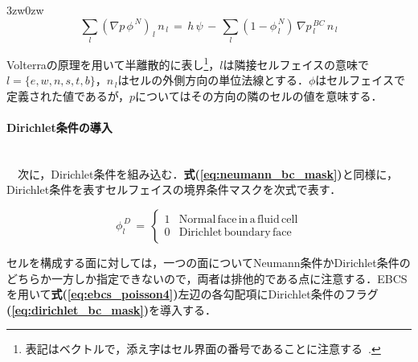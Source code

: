 \begin{indentation}{3zw}{0zw}
\begin{equation}
\sum \limits_l {\left( \nabla p \,\phi^{\,N} \right)}_{\,l} \,n_{\,l}
\,=\, h\,\psi \,-\, \sum \limits_l \left( 1-\phi^{\,N}_{\,l} \right) \,\nabla p^{\,BC}_{\,l} \,n_{\,l}
\label{eq:ebcs_poisson4}
\end{equation}

\noindent Volterraの原理を用いて半離散的に表し\footnote{表記はベクトルで，添え字はセル界面の番号であることに注意する~\cite[p.~39]{nakamura:98:handbook}.}，$l$は隣接セルフェイスの意味で$l=\{e,w,n,s,t,b\}$，$n_{\,l}$はセルの外側方向の単位法線とする．$\phi$はセルフェイスで定義された値であるが，$p$についてはその方向の隣のセルの値を意味する．

%
\paragraph{Dirichlet条件の導入} $\mbox{}$\\
　次に，Dirichlet条件を組み込む．\textbf{式(\ref{eq:neumann_bc_mask})}と同様に，Dirichlet条件を表すセルフェイスの境界条件マスクを次式で表す．

\begin{equation}
\phi^{\,D}_l \, = \, \left\{
\begin{array}{ll}
1 & \mathrm{Normal\,face\,in\,a\,fluid\,cell}\\
0 & \mathrm{Dirichlet\,boundary\,face}
\end{array} \right. 
\label{eq:dirichlet_bc_mask}
\end{equation}

\noindent セルを構成する面に対しては，一つの面についてNeumann条件かDirichlet条件のどちらか一方しか指定できないので，両者は排他的である点に注意する．EBCSを用いて\textbf{式(\ref{eq:ebcs_poisson4})}左辺の各勾配項にDirichlet条件のフラグ\textbf{(\ref{eq:dirichlet_bc_mask})}を導入する．


\end{indentation}
